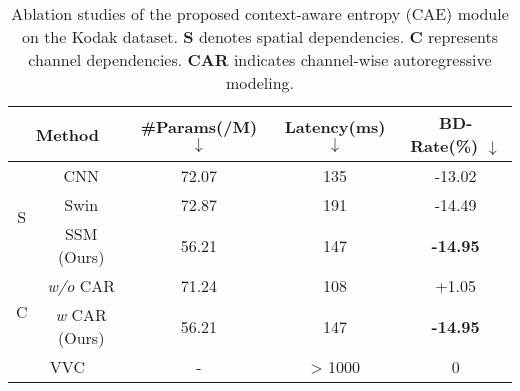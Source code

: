 \begin{table}[t]
\centering
\setlength{\tabcolsep}{3pt}
\caption{
Ablation studies of the proposed context-aware entropy (CAE) module on the Kodak dataset.
\textbf{S} denotes spatial dependencies.
\textbf{C} represents channel dependencies.
\textbf{CAR} indicates channel-wise autoregressive modeling.
}
\renewcommand{\arraystretch}{1.05}
\begin{tabular}{cc|ccc}
\toprule
\multicolumn{2}{c|}{\textbf{Method}} & \textbf{\#Params(/M)} $\downarrow$  & \textbf{Latency(ms)} $\downarrow$& \textbf{BD-Rate(\%)} $\downarrow$ \\ \midrule \midrule
\multicolumn{1}{c|}{\multirow{3}{*}{S}}   & CNN  & 72.07 & 135 & -13.02 \\ 
\multicolumn{1}{c|}{}                     & Swin & 72.87 & 191 & -14.49 \\ 
\multicolumn{1}{c|}{}                     & SSM (Ours)  & 56.21 & 147 &  \textbf{-14.95} \\ \midrule
\multicolumn{1}{c|}{\multirow{2}{*}{C}} & \textit{w/o} CAR & 71.24 & 108 & +1.05 \\
\multicolumn{1}{c|}{}                   & \textit{w} CAR (Ours)   &  56.21& 147 &  \textbf{-14.95} \\ \midrule
\multicolumn{2}{c|}{VVC} &   -  &  \textgreater{} 1000 & 0 \\ \bottomrule
\end{tabular}
\label{tab5}
\end{table}